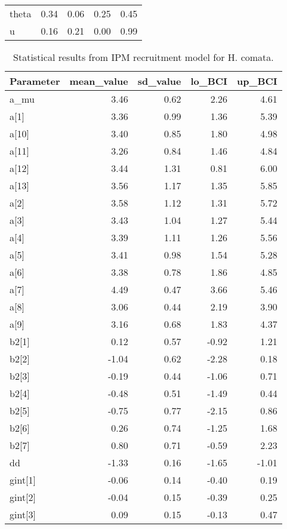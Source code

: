 \documentclass[12pt,]{article}
\begin{document}
\begin{table}[ht]
{\begin{tabular}{lrrrr}
  theta & 0.34 & 0.06 & 0.25 & 0.45 \\ 
  u & 0.16 & 0.21 & 0.00 & 0.99 \\ 
   \hline
\end{tabular}
}
\end{table}\begin{table}[ht]
\centering
\caption{Statistical results from IPM recruitment model for H. comata.} 
{\footnotesize
\begin{tabular}{lrrrr}
  \hline
Parameter & mean\_value & sd\_value & lo\_BCI & up\_BCI \\ 
  \hline
a\_mu & 3.46 & 0.62 & 2.26 & 4.61 \\ 
  a[1] & 3.36 & 0.99 & 1.36 & 5.39 \\ 
  a[10] & 3.40 & 0.85 & 1.80 & 4.98 \\ 
  a[11] & 3.26 & 0.84 & 1.46 & 4.84 \\ 
  a[12] & 3.44 & 1.31 & 0.81 & 6.00 \\ 
  a[13] & 3.56 & 1.17 & 1.35 & 5.85 \\ 
  a[2] & 3.58 & 1.12 & 1.31 & 5.72 \\ 
  a[3] & 3.43 & 1.04 & 1.27 & 5.44 \\ 
  a[4] & 3.39 & 1.11 & 1.26 & 5.56 \\ 
  a[5] & 3.41 & 0.98 & 1.54 & 5.28 \\ 
  a[6] & 3.38 & 0.78 & 1.86 & 4.85 \\ 
  a[7] & 4.49 & 0.47 & 3.66 & 5.46 \\ 
  a[8] & 3.06 & 0.44 & 2.19 & 3.90 \\ 
  a[9] & 3.16 & 0.68 & 1.83 & 4.37 \\ 
  b2[1] & 0.12 & 0.57 & -0.92 & 1.21 \\ 
  b2[2] & -1.04 & 0.62 & -2.28 & 0.18 \\ 
  b2[3] & -0.19 & 0.44 & -1.06 & 0.71 \\ 
  b2[4] & -0.48 & 0.51 & -1.49 & 0.44 \\ 
  b2[5] & -0.75 & 0.77 & -2.15 & 0.86 \\ 
  b2[6] & 0.26 & 0.74 & -1.25 & 1.68 \\ 
  b2[7] & 0.80 & 0.71 & -0.59 & 2.23 \\ 
  dd & -1.33 & 0.16 & -1.65 & -1.01 \\ 
  gint[1] & -0.06 & 0.14 & -0.40 & 0.19 \\ 
  gint[2] & -0.04 & 0.15 & -0.39 & 0.25 \\ 
  gint[3] & 0.09 & 0.15 & -0.13 & 0.47 \\ 

\end{tabular}}
\end{table}
\end{document}
